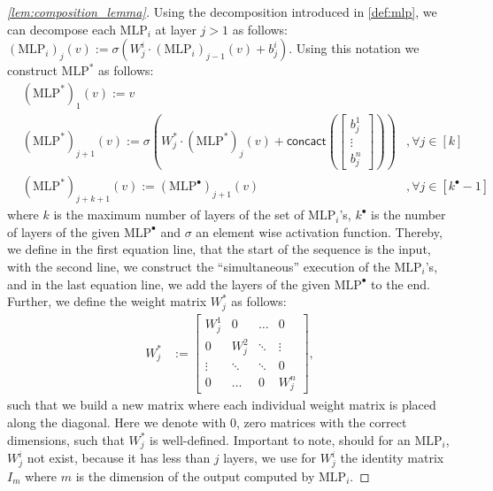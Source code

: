 \documentclass[11pt, dvipsnames, DIV=12]{scrreprt}
\theoremstyle{definition}
\newcommand{\mlp}{\text{MLP}}
\begin{document}
\begin{proof}[\cref{lem:composition_lemma}]
    Using the decomposition introduced in \cref{def:mlp}, we can decompose each $\mlp_i$ at layer $j > 1$ as follows: $(\mlp_i)_{j}(v) := \sigma(W^{i}_{j} \cdot (\mlp_i)_{j-1}(v) + b^i_j)$. Using this notation we construct $\mlp^*$ as follows:
    \begin{align*}
        &(\mlp^*)_{1}(v) := v\\
        &(\mlp^*)_{j+1}(v) := \sigma(W^*_j \cdot (\mlp^*)_{j} (v) + \textsf{concact}(
            \begin{bmatrix}
                b^1_j\\
                \vdots\\
                b^n_j
            \end{bmatrix})) &,\forall j \in [k]\\
        &(\mlp^*)_{j+k+1}(v) := (\mlp^\bullet)_{j+1}(v) &,\forall j \in [k^\bullet - 1]
    \end{align*}
    where $k$ is the maximum number of layers of the set of $\mlp_i$'s, $k^\bullet$ is the number of layers of the given $\mlp^\bullet$ and $\sigma$ an element wise activation function. Thereby, we define in the first equation line, that the start of the sequence is the input, with the second line, we construct the ``simultaneous'' execution of the $\mlp_i$'s, and in the last equation line, we add the layers of the given $\mlp^\bullet$ to the end. Further, we define the weight matrix $W_j^*$ as follows: 
    \begin{align*}
        W^*_j &:= \begin{bmatrix}
            W^1_j & 0 & \hdots & 0\\
            0 & W^2_j & \ddots & \vdots\\
            \vdots & \ddots & \ddots & 0\\
            0 & \hdots & 0 & W^n_j
        \end{bmatrix},
    \end{align*}
    such that we build a new matrix where each individual weight matrix is placed along the diagonal. Here we denote with $0$, zero matrices with the correct dimensions, such that $W_j^*$ is well-defined. Important to note, should for an $\mlp_i$, $W^i_j$ not exist, because it has less than $j$ layers, we use for $W^i_j$ the identity matrix $I_m$ where $m$ is the dimension of the output computed by $\mlp_i$.
\end{proof}






\end{document}
